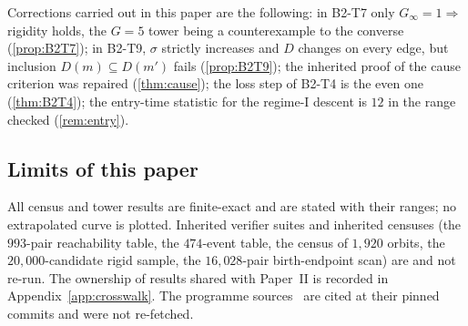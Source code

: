 Corrections carried out in this paper are the following: in B2-T7 only $G_\infty=1\Rightarrow$ rigidity holds, the $G=5$ tower being a counterexample to the converse (\cref{prop:B2T7}); in B2-T9, $\sigma$ strictly increases and $D$ changes on every edge, but inclusion $D(m)\subseteq D(m')$ fails (\cref{prop:B2T9}); the inherited proof of the cause criterion was repaired (\cref{thm:cause}); the loss step of B2-T4 is the even one (\cref{thm:B2T4}); the entry-time statistic for the regime-I descent is $12$ in the range checked (\cref{rem:entry}).

\subsection{Limits of this paper}
All census and tower results are finite-exact and are stated with their ranges; no extrapolated curve is plotted. Inherited verifier suites and inherited censuses (the $993$-pair reachability table, the $474$-event table, the census of $1{,}920$ orbits, the $20{,}000$-candidate rigid sample, the $16{,}028$-pair birth-endpoint scan) are  and not re-run. The ownership of results shared with Paper~II is recorded in Appendix~\ref{app:crosswalk}. The programme sources~\cite{FoundI,GEOI} are cited at their pinned commits and were not re-fetched.

